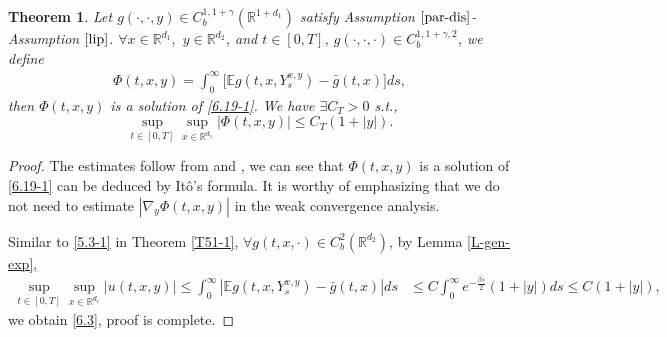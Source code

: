 \documentclass[11pt,reqno]{amsart}
\newtheorem{theorem}{\indent Theorem}[section]
\numberwithin{equation}{section}
\begin{document}
\begin{theorem}\label{T61-1}
Let $g(\cdot,\cdot,y)\in C_{b}^{1,1+\gamma}(\mathbb{R}^{1+d_{1}})$  satisfy Assumption $\ref{par-dis}$-Assumption $\ref{lip}$.	$\forall x\in \mathbb{R}^{d_{1}}, $  $y\in \mathbb{R}^{d_{2}} $, and $t\in [0,T]$,  $g(\cdot,\cdot,\cdot)\in C_{b}^{1,1+\gamma, 2}$, we define 
\begin{equation}\label{6.2-1}
	\begin{split}
	\Phi(t,x,y)=\int^{\infty}_{0}\big[ \mathbb{E}g(t,x,Y_{s}^{x,y})-\bar{g}(t,x)\big] ds,
	\end{split}
\end{equation}
then $\Phi(t,x,y)$ is a solution of \eqref{6.19-1}. We have %
$\exists C_T>0$ s.t.,
\begin{equation}\label{6.3}
	\sup_{t\in [0,T]}\sup_{x\in \mathbb{R}^{d_{1}}}|\Phi(t,x,y)|\leq C_{T}(1+|y|).
\end{equation}
\end{theorem}
\begin{proof}
The estimates follow from \cite[Proposition 3.3]{SXX} and \cite[Theorem 6.2]{KY}, we can see that $\Phi(t,x,y)$ is a solution of \eqref{6.19-1} can be deduced by It\^{o}'s formula. %
It is worthy of emphasizing that we do not need to estimate $|\nabla_{y}\Phi(t,x,y)|$  in the weak convergence analysis.


Similar to \eqref{5.3-1} in Theorem \ref{T51-1},  $\forall g(t,x,\cdot)\in C_{b}^{ 2}(\mathbb{R}^{d_{2}})$, by Lemma \ref{L-gen-exp},
\begin{align*}
	\sup_{t\in [0,T]}\sup_{x\in \mathbb{R}^{d_{1}}} |u(t,x,y)|\leq \int_{0}^{\infty}|\mathbb{E}g(t,x,Y_{s}^{x,y})-\bar{g}(t,x)|ds&\leq  C\int_{0}^{\infty}e^{-\frac{\beta s}{2}}(1+|y|)ds\leq  C(1+|y|),
\end{align*}
we obtain \eqref{6.3}, 	proof is complete.
\end{proof}
\end{document}
